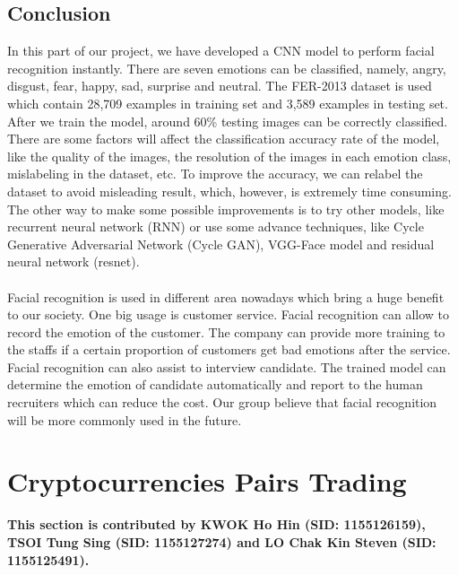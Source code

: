 \documentclass[11pt,a4paper]{article}
\begin{document}
    \subsection{Conclusion}
    In this part of our project, we have developed a CNN model to perform facial recognition instantly. There are seven emotions can be classified, namely, angry, disgust, fear, happy, sad, surprise and neutral. The FER-2013 dataset is used which contain 28,709 examples in training set and 3,589 examples in testing set. After we train the model, around 60\% testing images can be correctly classified. There are some factors will affect the classification accuracy rate of the model, like the quality of the images, the resolution of the images in each emotion class, mislabeling in the dataset, etc. To improve the accuracy, we can relabel the dataset to avoid misleading result, which, however, is extremely time consuming. The other way to make some possible improvements is to try other models, like recurrent neural network (RNN) or use some advance techniques, like Cycle Generative Adversarial Network (Cycle GAN), VGG-Face model and residual neural network (resnet). \\
    \\
    Facial recognition is used in different area nowadays which bring a huge benefit to our society. One big usage is customer service. Facial recognition can allow to record the emotion of the customer. The company can provide more training to the staffs if a certain proportion of customers get bad emotions after the service. Facial recognition can also assist to interview candidate. The trained model can determine the emotion of candidate automatically and report to the human recruiters which can reduce the cost. Our group believe that facial recognition will be more commonly used in the future.

    
    \newpage
    \section{Cryptocurrencies Pairs Trading}
    \textbf{This section is contributed by KWOK Ho Hin (SID: 1155126159), TSOI Tung Sing (SID: 1155127274) and LO Chak Kin Steven (SID: 1155125491).}
    
\end{document}
